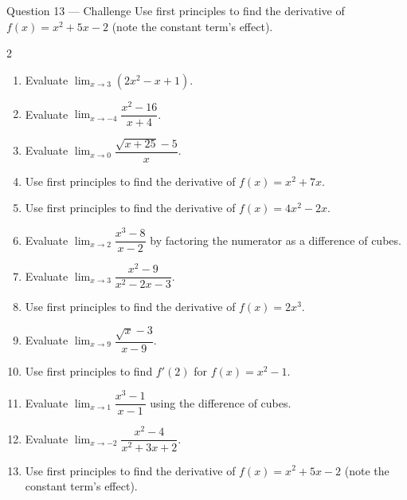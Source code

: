 \documentclass[11pt]{article}
\begin{document}
\begin{qbox}{Question 13 --- Challenge}
Use first principles to find the derivative of $f(x)=x^2+5x-2$ (note the constant term's effect).\workspace{3.4cm}
\end{qbox}

\clearpage
{}

\begin{recapbox}
\begin{multicols}{2}
\small
\begin{enumerate}[leftmargin=*,itemsep=3pt]
  \item Evaluate $\displaystyle\lim_{x\to3}(2x^2-x+1)$.
  \item Evaluate $\displaystyle\lim_{x\to-4}\dfrac{x^2-16}{x+4}$.
  \item Evaluate $\displaystyle\lim_{x\to0}\dfrac{\sqrt{x+25}-5}{x}$.
  \item Use first principles to find the derivative of $f(x)=x^2+7x$.
  \item Use first principles to find the derivative of $f(x)=4x^2-2x$.
  \item Evaluate $\displaystyle\lim_{x\to2}\dfrac{x^3-8}{x-2}$ by factoring the numerator as a difference of cubes.
  \item Evaluate $\displaystyle\lim_{x\to3}\dfrac{x^2-9}{x^2-2x-3}$.
  \item Use first principles to find the derivative of $f(x)=2x^3$.
  \item Evaluate $\displaystyle\lim_{x\to9}\dfrac{\sqrt x-3}{x-9}$.
  \item Use first principles to find $f'(2)$ for $f(x)=x^2-1$.
  \item Evaluate $\displaystyle\lim_{x\to1}\dfrac{x^3-1}{x-1}$ using the difference of cubes.
  \item Evaluate $\displaystyle\lim_{x\to-2}\dfrac{x^2-4}{x^2+3x+2}$.
  \item Use first principles to find the derivative of $f(x)=x^2+5x-2$ (note the constant term's effect).
\end{enumerate}
\end{multicols}
\end{recapbox}
\end{document}
